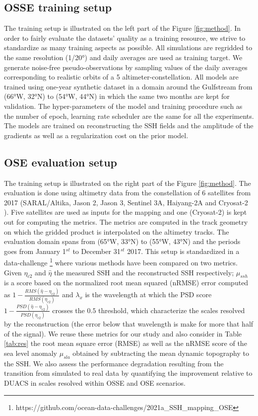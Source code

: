 \documentclass[draft]{agujournal2019}
\begin{document}
\subsection{OSSE training setup}
\label{ssec:training}
The training setup is illustrated on the left part of the Figure \ref{fig:method}.
In order to fairly evaluate the datasets' quality as a training resource, we strive to standardize as many training aspects as possible.
All simulations are regridded to the same resolution (1/20°) and daily averages are used as training target. We generate noise-free pseudo-observations by sampling values of the daily averages corresponding to realistic orbits of a 5 altimeter-constellation. All models are trained using one-year synthetic dataset in a domain around the Gulfstream from (66°W, 32°N) to (54°W, 44°N) in which the same two months are kept for validation. The hyper-parameters of the model and training procedure such as the number of epoch, learning rate scheduler are the same for all the experiments. The models are trained on reconstructing the SSH fields and the amplitude of the gradients as well as a regularization cost on the prior model.

\subsection{OSE evaluation setup}
\label{ssec:eval}
The training setup is illustrated on the right part of the Figure \ref{fig:method}.
The evaluation is done using altimetry data from the constellation of 6 satellites from 2017 (SARAL/Altika, Jason 2, Jason 3, Sentinel 3A, Haiyang-2A and Cryosat-2 ). Five satellites are used as inputs for the mapping and one (Cryosat-2) is kept out for computing the metrics. The metrics are computed in the track geometry on which the gridded product is interpolated on the altimetry tracks. The evaluation domain spans from (65°W, 33°N) to (55°W, 43°N)  and the periods goes from January 1$^{st}$ to December 31$^{st}$ 2017. This setup is standardized in a data-challenge \footnote{https://github.com/ocean-data-challenges/2021a\_SSH\_mapping\_OSE} where various methods have been compared on two metrics. Given $\eta_{c2}$ and $\hat{\eta}$ the measured SSH and the reconstructed SSH respectively; $\mu_{ssh}$ is a score based on the normalized root mean squared (nRMSE) error  computed as $1 - \frac{RMS(\hat{\eta} - \eta_{c2})}{RMS(\eta_{c2})}$ and $\lambda_x$ is the wavelength at which the PSD score  $1 - \frac{PSD(\hat{\eta} - \eta_{c2})}{PSD(\eta_{c2})}$ crosses the $0.5$ threshold, which characterize the scales resolved by the reconstruction (the error below that wavelength is make for more that half of the signal). We reuse these metrics for our study and also consider in Table \ref{tab:res} the root mean square error (RMSE) as well as the nRMSE score of the sea level anomaly $\mu_{sla}$ obtained by subtracting the mean dynamic topography to the SSH. We also assess the performance degradation resulting from the transition from simulated to real data by quantifying the improvement relative to DUACS in scales resolved within OSSE and OSE scenarios.
\end{document}
